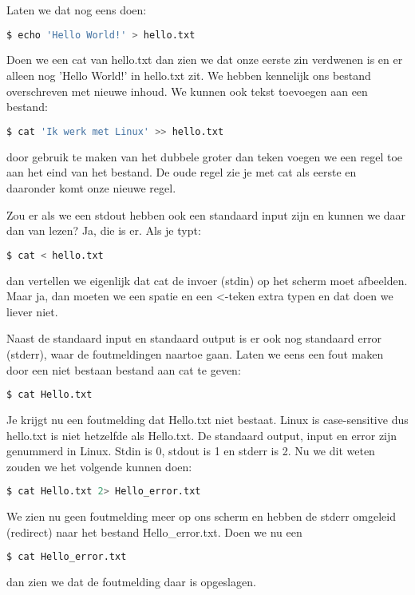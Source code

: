 Laten we dat nog eens doen:

\begin{lstlisting}[language=bash]
$ echo 'Hello World!' > hello.txt
\end{lstlisting}

Doen we een cat van hello.txt dan zien we dat onze eerste zin verdwenen is en er alleen nog 'Hello World!' in hello.txt
zit. We hebben kennelijk ons bestand overschreven met nieuwe inhoud. We kunnen ook tekst toevoegen aan een bestand:

\begin{lstlisting}[language=bash]
$ cat 'Ik werk met Linux' >> hello.txt
\end{lstlisting}

door gebruik te maken van het dubbele groter dan teken voegen we een regel toe aan het eind van het bestand. De oude
regel zie je met cat als eerste en daaronder komt onze nieuwe regel.

Zou er als we een stdout hebben ook een standaard input zijn en kunnen we daar dan van lezen? Ja, die is er. Als je
typt:

\begin{lstlisting}[language=bash]
$ cat < hello.txt
\end{lstlisting}

dan vertellen we eigenlijk dat cat de invoer (stdin) op het scherm moet afbeelden. Maar ja, dan moeten we een spatie en
een <-teken extra typen en dat doen we liever niet.

Naast de standaard input en standaard output is er ook nog standaard error (stderr), waar de foutmeldingen naartoe gaan.
Laten we eens een fout maken door een niet bestaan bestand aan cat te geven:

\begin{lstlisting}[language=bash]
$ cat Hello.txt
\end{lstlisting}

Je krijgt nu een foutmelding dat Hello.txt niet bestaat. Linux is case-sensitive dus hello.txt is niet hetzelfde als
Hello.txt. De standaard output, input en error zijn genummerd in Linux. Stdin is 0, stdout is 1 en stderr is 2. Nu we
dit weten zouden we het volgende kunnen doen:

\begin{lstlisting}[language=bash]
$ cat Hello.txt 2> Hello_error.txt
\end{lstlisting}

We zien nu geen foutmelding meer op ons scherm en hebben de stderr omgeleid (redirect) naar het bestand
Hello\_error.txt. Doen we nu een
\begin{lstlisting}[language=bash]
$ cat Hello_error.txt
\end{lstlisting}
dan zien we dat de foutmelding daar is opgeslagen.

